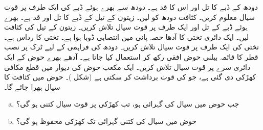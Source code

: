 دودھ کے ڈبے کا تل  اور اس کا قد  ہے۔ دودھ سے بھرے ہوئے ڈبے کی ایک طرف پر قوت سیال معلوم کریں۔ کثافت دودھ کو  لیں۔
زیتون کے  تیل کے ڈبے کا تل  اور قد  ہے۔ بھرے ہوئے ڈبے کے تل  اور ایک طرف پر قوت سیال تلاش کریں۔ زیتون کے تیل کی کثافت  لیں۔
ایک دائری تختی کا آدھا حصہ پانی میں انتصابی ڈوبا ہوا  ہے۔ تختی کا رداس  ہے۔ تختی کی ایک طرف پر قوت سیال تلاش کریں۔
دودھ کی فراہمی کے لیے ٹرک پر نصب   قطر کا  قائمہ  بیلنی حوض  افقی رکھ کر استعمال کیا جاتا ہے۔ آدھے بھرے حوض کے ایک دائری  سرے  پر قوت سیال تلاش کریں۔ 
ایک مکعب حوض کی دیوار میں قطع مکافی کھڑکی دی گئی ہے، جو  کی قوت برداشت کر سکتی ہے (شکل )۔ حوض میں  کثافت کا سیال بھرا جائے گا۔ 
\begin{enumerate}[a.]
\item
جب حوض میں سیال کی گہرائی  ہو، تب کھڑکی پر قوت سیال کتنی  ہو گی؟
\item
حوض میں سیال کی کتنی گہرائی تک کھڑکی محفوظ ہو گی؟
\end{enumerate}
